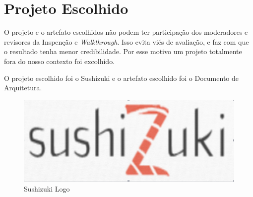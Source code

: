 \chapter{Projeto Escolhido}

O projeto e o artefato escolhidos não podem ter participação dos moderadores e revisores da Inspenção e \textit{Walkthrough}.
Isso evita viés de avaliação, e faz com que o resultado tenha menor credibilidade. Por esse motivo um projeto totalmente fora 
do nosso contexto foi excolhido.

O projeto escolhido foi o Sushizuki e o artefato escolhido foi o Documento de Arquitetura.


\begin{figure}[H]
  \center
  \includegraphics[width=1\textwidth]{figuras/sushizuki.png}
  \caption{Sushizuki Logo}
  \label{fig:sushizuki}
\end{figure}

